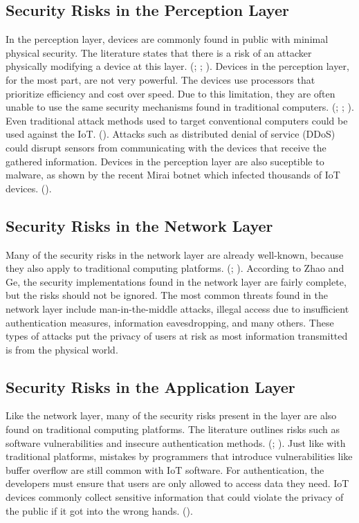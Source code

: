 \documentclass[letterpaper, 12pt]{article}
\begin{document}
\begin{flushleft}
\subsection*{Security Risks in the Perception Layer}
In the perception layer, devices are commonly found in public with minimal physical security. The literature states that there is a risk of an attacker physically
modifying a device at this layer. (\cite{Zhao6746513}; \cite{Xiaohui6643029}; \cite{Suo6188257}). Devices in the perception layer, for the most part,
are not very powerful. The devices use processors that prioritize efficiency and cost over speed. Due to this limitation, they are often unable to use the same security mechanisms found in traditional computers. 
(\cite{Suo6188257}; \cite{Granjal7005393}; \cite{Xiaohui6643029}). Even traditional attack methods used to target conventional computers could be 
used against the IoT. (\cite{Zhao6746513}). Attacks such as distributed denial of service (DDoS) could disrupt sensors from communicating with the devices that receive the gathered information. Devices in the perception layer are also suceptible to malware, as shown by the recent Mirai
botnet which infected thousands of IoT devices. (\cite{Incapsula}). 

\subsection*{Security Risks in the Network Layer}
Many of the security risks in the network layer are already well-known, because they also apply to traditional computing platforms. 
(\cite{Zhao6746513}; \cite{Xiaohui6643029}). According to Zhao and Ge, the security implementations found in the network layer are fairly complete, but
the risks should not be ignored. The most common threats found in the network layer include man-in-the-middle attacks, illegal access due to 
insufficient authentication measures, information eavesdropping, and many others. These types of attacks put the privacy of users at risk as most
information transmitted is from the physical world. 

\subsection*{Security Risks in the Application Layer}
Like the network layer, many of the security risks present in the layer are also found on traditional computing platforms. The literature outlines
risks such as software vulnerabilities and insecure authentication methods. (\cite{Zhao6746513}; \cite{Suo6188257}). Just like with traditional
platforms, mistakes by programmers that introduce vulnerabilities like buffer overflow are still common with IoT software. For authentication,
the developers must ensure that users are only allowed to access data they need. IoT devices commonly collect sensitive information that could
violate the privacy of the public if it got into the wrong hands. (\cite{Zhang:2015:EST:2714576.2737091}). 


\end{flushleft}
\end{document}
